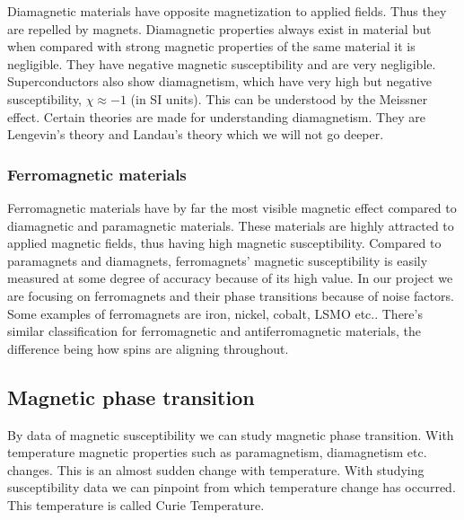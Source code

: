 Diamagnetic materials have opposite magnetization to applied fields. Thus they are repelled by magnets. Diamagnetic properties always exist in material but when compared with strong magnetic properties of the same material it is negligible. They have negative magnetic susceptibility and are very negligible. Superconductors also show diamagnetism, which have very high but negative susceptibility, $\chi \approx -1$ (in SI units). This can be understood by the Meissner effect. Certain theories are made for understanding diamagnetism. They are Lengevin’s theory and Landau’s theory which we will not go deeper.\cite{wikidia}

\subsubsection{Ferromagnetic materials}
Ferromagnetic materials have by far the most visible magnetic effect compared to diamagnetic and paramagnetic materials. These materials are highly attracted to applied magnetic fields, thus having high magnetic susceptibility. Compared to paramagnets and diamagnets, ferromagnets' magnetic susceptibility is easily measured at some degree of accuracy because of its high value. In our project we are focusing on ferromagnets and their phase transitions because of noise factors. Some examples of ferromagnets are iron, nickel, cobalt, LSMO etc.. There’s similar classification for ferromagnetic and antiferromagnetic materials, the difference being how spins are aligning throughout. \cite{wikiferro}

\subsection{Magnetic phase transition}

By data of magnetic susceptibility we can study magnetic phase transition. With temperature magnetic properties such as paramagnetism, diamagnetism etc. changes. This is an almost sudden change with temperature. With studying susceptibility data we can pinpoint from which temperature change has occurred. This temperature is called Curie Temperature.

